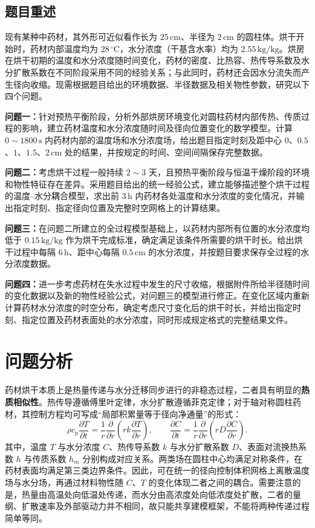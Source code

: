 \documentclass[12pt,a4paper,fontset=none]{ctexart}
\begin{document}
\subsection{题目重述}

现有某种中药材，其外形可近似看作长为 $25\,\mathrm{cm}$、半径为 $2\,\mathrm{cm}$ 的圆柱体。烘干开始时，药材内部温度均为 $28\,{}^\circ\mathrm{C}$，水分浓度（干基含水率）均为 $2.55\,\mathrm{kg/kg}$。烘房在烘干初期的温度和水分浓度随时间变化，药材的密度、比热容、热传导系数及水分扩散系数在不同阶段采用不同的经验关系；与此同时，药材还会因水分流失而产生径向收缩。现需根据题目给出的环境数据、半径数据及相关物性参数，研究以下四个问题。

\textbf{问题一：}针对预热平衡阶段，分析外部烘房环境变化对圆柱药材内部传热、传质过程的影响，建立药材温度和水分浓度随时间及径向位置变化的数学模型。计算 $0\sim1800\,\mathrm{s}$ 内药材内部的温度场和水分浓度场，给出题目指定时刻及距中心 $0$、$0.5$、$1$、$1.5$、$2\,\mathrm{cm}$ 处的结果，并按规定的时间、空间间隔保存完整数据。

\textbf{问题二：}考虑烘干过程一般持续 $2\sim3$ 天，且预热平衡阶段与恒温干燥阶段的环境和物性特征存在差异。采用题目给出的统一经验公式，建立能够描述整个烘干过程的温度--水分耦合模型，求出前 $3\,\mathrm{h}$ 内药材各处温度和水分浓度的变化情况，并输出指定时刻、指定径向位置及完整时空网格上的计算结果。

\textbf{问题三：}在问题二所建立的全过程模型基础上，以药材内部所有位置的水分浓度均低于 $0.15\,\mathrm{kg/kg}$ 作为烘干完成标准，确定满足该条件所需要的烘干时长。给出烘干过程中每隔 $6\,\mathrm{h}$、距中心每隔 $0.5\,\mathrm{cm}$ 的水分浓度，并按题目要求保存全过程的水分浓度数据。

\textbf{问题四：}进一步考虑药材在失水过程中发生的尺寸收缩，根据附件所给半径随时间的变化数据以及新的物性经验公式，对问题三的模型进行修正。在变化区域内重新计算药材水分浓度的时空分布，确定考虑尺寸变化后的烘干时长，并给出指定时刻、指定位置及药材表面处的水分浓度，同时形成规定格式的完整结果文件。



\section{问题分析}

药材烘干本质上是热量传递与水分迁移同步进行的非稳态过程，二者具有明显的\textbf{热质相似性}。热传导遵循傅里叶定律，水分扩散遵循菲克定律；对于轴对称圆柱药材，其控制方程均可写成“局部积累量等于径向净通量”的形式：
\begin{equation}
 \rho c_p\frac{\partial T}{\partial t}
 =\frac{1}{r}\frac{\partial}{\partial r}
 \left(rk\frac{\partial T}{\partial r}\right),\qquad
 \frac{\partial C}{\partial t}
 =\frac{1}{r}\frac{\partial}{\partial r}
 \left(rD\frac{\partial C}{\partial r}\right).
\end{equation}
其中，温度 $T$ 与水分浓度 $C$、热传导系数 $k$ 与水分扩散系数 $D$、表面对流换热系数 $h$ 与传质系数 $h_m$ 分别构成对应关系。两类场在圆柱中心均满足对称条件，在药材表面均满足第三类边界条件。因此，可在统一的径向控制体积网格上离散温度场与水分场，再通过材料物性随 $C$、$T$ 的变化体现二者之间的耦合。需要注意的是，热量由高温处向低温处传递，而水分由高浓度处向低浓度处扩散，二者的量纲、扩散速率及外部驱动力并不相同，故只能共享建模框架，不能将两种传递过程简单等同。
\end{document}
